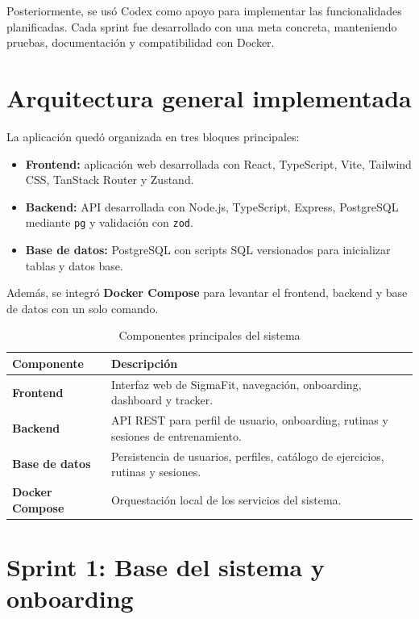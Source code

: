 \documentclass[12pt,a4paper]{article}
\begin{document}
Posteriormente, se usó Codex como apoyo para implementar las funcionalidades planificadas. Cada sprint fue desarrollado con una meta concreta, manteniendo pruebas, documentación y compatibilidad con Docker.

\section{Arquitectura general implementada}

La aplicación quedó organizada en tres bloques principales:

\begin{itemize}
    \item \textbf{Frontend:} aplicación web desarrollada con React, TypeScript, Vite, Tailwind CSS, TanStack Router y Zustand.
    \item \textbf{Backend:} API desarrollada con Node.js, TypeScript, Express, PostgreSQL mediante \texttt{pg} y validación con \texttt{zod}.
    \item \textbf{Base de datos:} PostgreSQL con scripts SQL versionados para inicializar tablas y datos base.
\end{itemize}

Además, se integró \textbf{Docker Compose} para levantar el frontend, backend y base de datos con un solo comando.

\begin{table}[H]
\centering
\caption{Componentes principales del sistema}
\renewcommand{\arraystretch}{1.3}
\begin{tabularx}{\textwidth}{>{\bfseries}p{3.2cm} X}
\toprule
Componente & Descripción \\
\midrule
Frontend & Interfaz web de SigmaFit, navegación, onboarding, dashboard y tracker. \\
Backend & API REST para perfil de usuario, onboarding, rutinas y sesiones de entrenamiento. \\
Base de datos & Persistencia de usuarios, perfiles, catálogo de ejercicios, rutinas y sesiones. \\
Docker Compose & Orquestación local de los servicios del sistema. \\
\bottomrule
\end{tabularx}
\end{table}

\section{Sprint 1: Base del sistema y onboarding}
\end{document}
